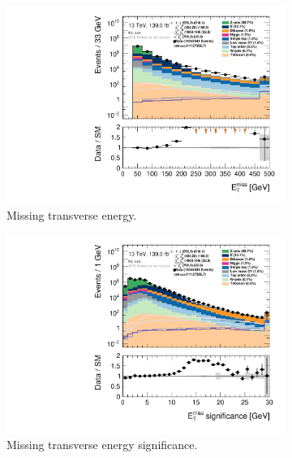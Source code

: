 \begin{figure}[H]
    \\
    \begin{subfigure}[t!]{0.49\textwidth}
        \includegraphics[width=\textwidth]{Figures/ML_cuts/hist1d_met_Et_ML_cuts.pdf}
    \caption{Missing transverse energy.}
    \label{fig:metMLcuts}
    \end{subfigure}
    \begin{subfigure}[t!]{0.49\textwidth}
        \includegraphics[width=\textwidth]{Figures/ML_cuts/hist1d_met_Sign_ML_cuts.pdf}
    \caption{Missing transverse energy significance.}
    \label{fig:metSignMLcuts}
    \end{subfigure}
    \\
    \begin{subfigure}[t!]{0.49\textwidth}

\end{subfigure}
\end{figure}
